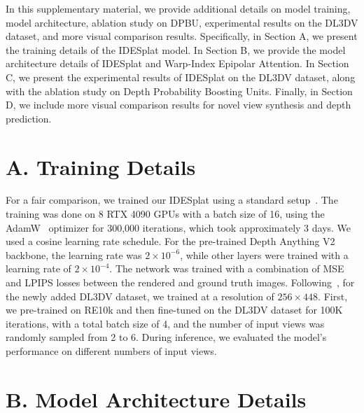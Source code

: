 \clearpage
\setcounter{page}{1}
\maketitlesupplementary

In this supplementary material, we provide additional details on model training, model architecture, ablation study on DPBU, experimental results on the DL3DV dataset, and more visual comparison results. Specifically, in Section A, we present the training details of the IDESplat model. In Section B, we provide the model architecture details of IDESplat and Warp-Index Epipolar Attention. In Section C, we present the experimental results of IDESplat on the DL3DV dataset, along with the ablation study on Depth Probability Boosting Units. Finally, in Section D, we include more visual comparison results for novel view synthesis and depth prediction.

\section*{A. Training Details}
\label{sec:training_details}
% 

For a fair comparison, we trained our IDESplat using a standard setup~\cite{chen2024mvsplat, liu2025monosplat, xu2025depthsplat}. The training was done on 8 RTX 4090 GPUs with a batch size of 16, using the AdamW~\citep{loshchilov2017decoupled} optimizer for 300,000 iterations, which took approximately 3 days. We used a cosine learning rate schedule. For the pre-trained Depth Anything V2~\cite{yang2024depth} backbone, the learning rate was $2 \times 10^{-6}$, while other layers were trained with a learning rate of $2 \times 10^{-4}$. The network was trained with a combination of MSE and LPIPS losses between the rendered and ground truth images. Following~\cite{xu2025depthsplat}, for the newly added DL3DV dataset, we trained at a resolution of $256 \times 448$. First, we pre-trained on RE10k and then fine-tuned on the DL3DV dataset for 100K iterations, with a total batch size of 4, and the number of input views was randomly sampled from 2 to 6. During inference, we evaluated the model’s performance on different numbers of input views.


\section*{B. Model Architecture Details}
\label{sec:model_arch_details}

